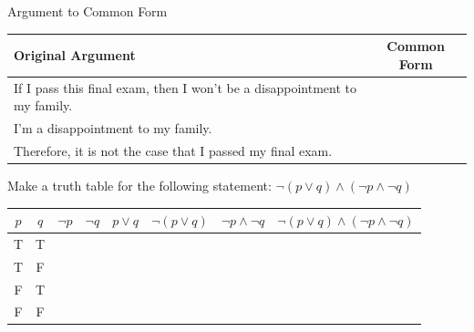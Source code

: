 \documentclass[letterpaper]{exam}
\begin{document}
\begin{questions}



        
        \question Argument to Common Form

        \begin{tabular}{l|c}
            Original Argument & Common Form \\ \hline
            If I pass this final exam, then I won't be a disappointment to my family. & \hspace{3cm} \\
            I'm a disappointment to my family. & \\
            Therefore, it is not the case that I passed my final exam. & \\
        \end{tabular}



        
        \question Make a truth table for the following statement:
        $\neg (p \lor q) \land (\neg p \land \neg q)$
        
        \begin{tabular}{|c|c|c|c|c|c|c|c|}
            \hline
            $p$ & $q$ & $\neg p$ & $\neg q$ & $p \lor q$ & $\neg (p \lor q)$ & $\neg p \land \neg q$ & $\neg (p \lor q) \land (\neg p \land \neg q)$\\ \hline
            T & T &  &  &  &  &  &\\ \hline
            T & F &  &  &  &  &  &\\ \hline
            F & T &  &  &  &  &  &\\ \hline
            F & F &  &  &  &  &  &\\ \hline
        \end{tabular}




\end{questions}
\end{document}
